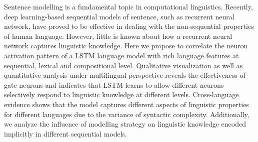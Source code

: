 Sentence modelling is a fundamental topic in computational linguistics. Recently, deep learning-based sequential models of sentence, such as recurrent neural network, have proved to be effective in dealing with the non-sequential properties of human language. However, little is known about how a recurrent neural network captures linguistic knowledge. Here we propose to correlate the neuron activation pattern of a LSTM language model with rich language features at sequential, lexical and compositional level. Qualitative visualization as well as quantitative analysis under multilingual perspective reveals the effectiveness of gate neurons and indicates that LSTM learns to allow different neurons selectively respond to linguistic knowledge at different levels. Cross-language evidence shows that the model captures different aspects of linguistic properties for different languages due to the variance of syntactic complexity. Additionally, we analyze the influence of modelling strategy on linguistic knowledge encoded implicitly in different sequential models.
